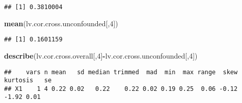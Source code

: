 \documentclass[
]{article}
\newenvironment{Shaded}{\begin{snugshade}}{\end{snugshade}}
\newcommand{\DecValTok}[1]{\textcolor[rgb]{0.00,0.00,0.81}{#1}}
\newcommand{\KeywordTok}[1]{\textcolor[rgb]{0.13,0.29,0.53}{\textbf{#1}}}
\newcommand{\NormalTok}[1]{#1}
\newcommand{\OperatorTok}[1]{\textcolor[rgb]{0.81,0.36,0.00}{\textbf{#1}}}
\newcommand{\StringTok}[1]{\textcolor[rgb]{0.31,0.60,0.02}{#1}}
\begin{document}
\begin{Shaded}
\end{Shaded}

\begin{verbatim}
## [1] 0.3810004
\end{verbatim}

\begin{Shaded}
\begin{Highlighting}[]
\KeywordTok{mean}\NormalTok{(lv.cor.cross.unconfounded[,}\DecValTok{4}\NormalTok{])}
\end{Highlighting}
\end{Shaded}

\begin{verbatim}
## [1] 0.1601159
\end{verbatim}

\begin{Shaded}
\begin{Highlighting}[]
\KeywordTok{describe}\NormalTok{(lv.cor.cross.overall[,}\DecValTok{4}\NormalTok{]}\OperatorTok{-}\NormalTok{lv.cor.cross.unconfounded[,}\DecValTok{4}\NormalTok{])}
\end{Highlighting}
\end{Shaded}

\begin{verbatim}
##    vars n mean   sd median trimmed  mad  min  max range  skew kurtosis   se
## X1    1 4 0.22 0.02   0.22    0.22 0.02 0.19 0.25  0.06 -0.12    -1.92 0.01
\end{verbatim}
\end{document}
